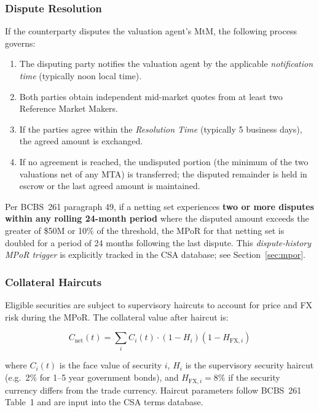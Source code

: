 \documentclass[11pt,a4paper]{article}
\begin{document}
\subsubsection{Dispute Resolution}

If the counterparty disputes the valuation agent's MtM, the following process
governs:

\begin{enumerate}[noitemsep]
  \item The disputing party notifies the valuation agent by the applicable
        \emph{notification time} (typically noon local time).
  \item Both parties obtain independent mid-market quotes from at least two
        Reference Market Makers.
  \item If the parties agree within the \emph{Resolution Time} (typically 5
        business days), the agreed amount is exchanged.
  \item If no agreement is reached, the undisputed portion (the minimum of the
        two valuations net of any MTA) is transferred; the disputed remainder
        is held in escrow or the last agreed amount is maintained.
\end{enumerate}

Per BCBS~261 paragraph 49, if a netting set experiences \textbf{two or more
disputes within any rolling 24-month period} where the disputed amount exceeds
the greater of \$50M or 10\% of the threshold, the MPoR for that netting set
is doubled for a period of 24 months following the last dispute. This
\emph{dispute-history MPoR trigger} is explicitly tracked in the CSA database;
see Section~\ref{sec:mpor}.

\subsubsection{Collateral Haircuts}

Eligible securities are subject to supervisory haircuts to account for price
and FX risk during the MPoR. The collateral value after haircut is:

\begin{equation}
  C_{\text{net}}(t) = \sum_{i} C_i(t) \cdot (1 - H_i)(1 - H_{\text{FX},i})
  \label{eq:haircut}
\end{equation}

where $C_i(t)$ is the face value of security $i$, $H_i$ is the supervisory
security haircut (e.g.\ 2\% for 1--5 year government bonds), and
$H_{\text{FX},i} = 8\%$ if the security currency differs from the trade
currency. Haircut parameters follow BCBS~261 Table~1 and are input into the
CSA terms database.
\end{document}
